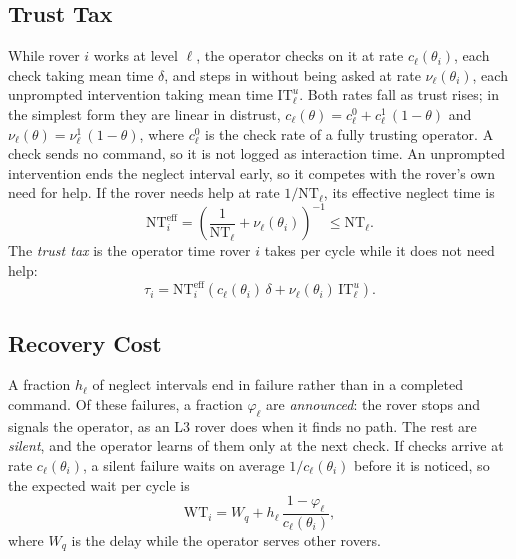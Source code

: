 \documentclass[conference]{IEEEtran}
\begin{document}
\subsection{Trust Tax}
\label{sec:trust-tax}
While rover $i$ works at level $\ell$, the operator checks on it at
rate $c_\ell(\theta_i)$, each check taking mean time $\delta$, and
steps in without being asked at rate $\nu_\ell(\theta_i)$, each
unprompted intervention taking mean time $\mathrm{IT}^{u}_\ell$. Both
rates fall as trust rises; in the simplest form they are linear in
distrust, $c_\ell(\theta) = c^{0}_\ell + c^{1}_\ell\,(1-\theta)$ and
$\nu_\ell(\theta) = \nu^{1}_\ell\,(1-\theta)$, where $c^{0}_\ell$ is the
check rate of a fully trusting operator. A check sends no command, so it is not
logged as interaction time. An unprompted intervention ends the
neglect interval early, so it competes with the rover's own need for
help. If the rover needs help at rate $1/\mathrm{NT}_\ell$, its
effective neglect time is
\begin{equation}
  \mathrm{NT}^{\mathrm{eff}}_i =
  \left( \frac{1}{\mathrm{NT}_\ell} + \nu_\ell(\theta_i) \right)^{-1}
  \le \mathrm{NT}_\ell .
  \label{eq:nt-eff}
\end{equation}
The \emph{trust tax} is the operator time rover $i$ takes per cycle
while it does not need help:
\begin{equation}
  \tau_i = \mathrm{NT}^{\mathrm{eff}}_i
  \left( c_\ell(\theta_i)\,\delta + \nu_\ell(\theta_i)\,\mathrm{IT}^{u}_\ell \right).
  \label{eq:trust-tax}
\end{equation}

\subsection{Recovery Cost}
\label{sec:recovery}
A fraction $h_\ell$ of neglect intervals end in failure rather than
in a completed command. Of these failures, a fraction $\varphi_\ell$
are \emph{announced}: the rover stops and signals the operator, as an
L3 rover does when it finds no path. The rest are \emph{silent}, and
the operator learns of them only at the next check. If checks arrive
at rate $c_\ell(\theta_i)$, a silent failure waits on average
$1/c_\ell(\theta_i)$ before it is noticed, so the expected wait per
cycle is
\begin{equation}
  \mathrm{WT}_i = W_q + h_\ell\,\frac{1-\varphi_\ell}{c_\ell(\theta_i)},
  \label{eq:wt}
\end{equation}
where $W_q$ is the delay while the operator serves other rovers.
\end{document}
